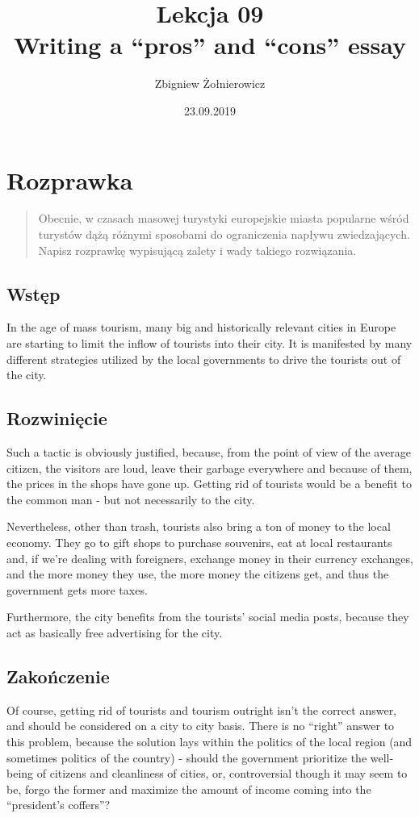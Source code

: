 \documentclass[a4paper]{article}
\begin{document}
\title{{\huge Lekcja 09} \\
{\large Writing a ``pros'' and ``cons'' essay}}
\author{Zbigniew Żołnierowicz}
\date{23.09.2019}
\maketitle
\section*{Rozprawka}
\begin{quote}
    Obecnie, w czasach masowej turystyki europejskie miasta popularne wśród turystów dążą różnymi sposobami do ograniczenia napływu zwiedzających. Napisz rozprawkę wypisującą zalety i wady takiego rozwiązania.
\end{quote}
\subsection*{Wstęp}
In the age of mass tourism, many big and historically relevant cities in Europe are starting to limit the inflow of tourists into their city.
It is manifested by many different strategies utilized by the local governments to drive the tourists out of the city.
\subsection*{Rozwinięcie}
Such a tactic is obviously justified, because, from the point of view of the average citizen, the visitors are loud, leave their garbage everywhere and because of them, the prices in the shops have gone up. Getting rid of tourists would be a benefit to the common man - but not necessarily to the city.

Nevertheless, other than trash, tourists also bring a ton of money to the local economy. They go to gift shops to purchase souvenirs, eat at local restaurants and, if we're dealing with foreigners, exchange money in their currency exchanges, and the more money they use, the more money the citizens get, and thus the government gets more taxes.

Furthermore, the city benefits from the tourists' social media posts, because they act as basically free advertising for the city.
\subsection*{Zakończenie}
Of course, getting rid of tourists and tourism outright isn't the correct answer, and should be considered on a city to city basis. There is no ``right'' answer to this problem, because the solution lays within the politics of the local region (and sometimes politics of the country) - should the government prioritize the well-being of citizens and cleanliness of cities, or, controversial though it may seem to be, forgo the former and maximize the amount of income coming into the ``president's coffers''?
\end{document}
